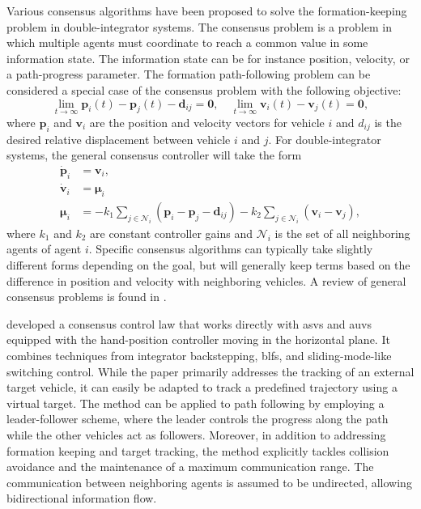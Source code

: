 Various consensus algorithms have been proposed to solve the formation-keeping problem in double-integrator systems. The consensus problem is a problem in which multiple agents must coordinate to reach a common value in some information state. The information state can be for instance position, velocity, or a path-progress parameter. The formation path-following problem can be considered a special case of the consensus problem with the following objective:
\begin{equation}
    \lim_{t\rightarrow\infty} \mathbf{p}_i(t) - \mathbf{p}_j(t) - \mathbf{d}_{ij} = \mathbf{0},\quad \lim_{t\rightarrow\infty} \mathbf{v}_i(t) - \mathbf{v}_j(t) = \mathbf{0},
\end{equation}
where $\mathbf{p}_i$ and $\mathbf{v}_i$ are the position and velocity vectors for vehicle $i$ and $d_{ij}$ is the desired relative displacement between vehicle $i$ and $j$. For double-integrator systems, the general consensus controller will take the form
\begin{subequations}\label{eq:first_order_consensus}
\begin{align}
    \dot{\mathbf{p}}_i &= \mathbf{v}_i,\\
    \dot{\mathbf{v}}_i &= \bm{\mu}_i\\
    \bm{\mu}_i &= -k_1 \sum_{j\in\mathcal{N}_i}(\mathbf{p}_i-\mathbf{p}_j - \mathbf{d}_{ij}) -k_2 \sum_{j \in  \mathcal{N}_i}( \mathbf{v}_i - \mathbf{v}_j),
\end{align}
\end{subequations}
where $k_1$ and $k_2$ are constant controller gains and $\mathcal{N}_i$ is the set of all neighboring agents of agent $i$. Specific consensus algorithms can typically take slightly different forms depending on the goal, but will generally keep terms based on the difference in position and velocity with neighboring vehicles. A review of general consensus problems is found in \cite{ren_survey_2005}.

\cite{restrepo_tracking--formation_2022} developed a consensus control law that works directly with \glspl{asv} and \glspl{auv} equipped with the hand-position controller moving in the horizontal plane. It combines techniques from integrator backstepping, \glspl{blf}, and sliding-mode-like switching control. While the paper primarily addresses the tracking of an external target vehicle, it can easily be adapted to track a predefined trajectory using a virtual target. The method can be applied to path following by employing a leader-follower scheme, where the leader controls the progress along the path while the other vehicles act as followers. Moreover, in addition to addressing formation keeping and target tracking, the method explicitly tackles collision avoidance and the maintenance of a maximum communication range. The communication between neighboring agents is assumed to be undirected, allowing bidirectional information flow.

